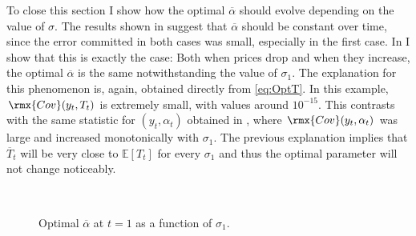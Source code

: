 \documentclass[english, a4paper, 12pt]{article}
\begin{document}
To close this section I show how the optimal $\overline{\alpha}$ should evolve depending on the value of $\sigma$. The results shown in  suggest that $\overline{\alpha}$ should be constant over time, since the error committed in both cases was small, especially in the first case. In  I show that this is exactly the case: Both when prices drop and when they increase, the optimal $\overline{\alpha}$ is the same notwithstanding the value of $\sigma_{1}$. The explanation for this phenomenon is, again, obtained directly from \eqref{eq:OptT}. In this example, $\rmx{Cov}(y_{t}, T_{t})$ is extremely small, with values around $10^{-15}$. This contrasts with the same statistic for $(y_{t}, \alpha_{t})$ obtained in , where $\rmx{Cov}(y_{t}, \alpha_{t})$ was large and increased monotonically with $\sigma_{1}$. The previous explanation implies that $\overline{T}_{t}$ will be very close to $\mathbb{E}[T_{t}]$ for every $\sigma_{1}$ and thus the optimal parameter will not change noticeably.
	\begin{figure}[H] 
		\caption{Optimal $\overline{\alpha}$ at $t = 1$ as a function of $\sigma_{1}$.}
		\label{fig:CategoryAlphaPlot}
		\,
	\end{figure}
\end{document}
